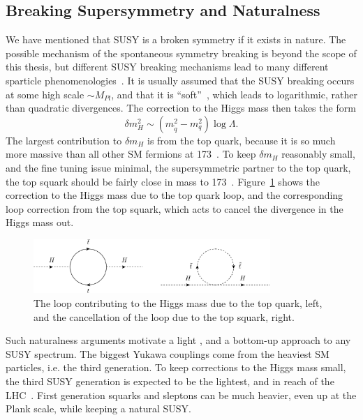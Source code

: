 \subsection{Breaking Supersymmetry and Naturalness \label{th:susyBreaking}}

We have mentioned that \ac{SUSY} is a broken symmetry if it exists in nature.
The possible mechanism of the spontaneous symmetry breaking is beyond the scope of this thesis, 
but different \ac{SUSY} breaking mechanisms lead to many different sparticle phenomenologies~\cite{susyMot2}. 
It is usually assumed that the \ac{SUSY} breaking occurs at some high scale $\sim M_{Pl}$, and that it is ``soft''~\cite{softsusy}, which leads to logarithmic, rather than quadratic divergences.
The correction to the Higgs mass then takes the form
\begin{equation}
\delta m_{H}^{2} \sim \left( m_{\tilde{q}}^{2} - m_{q}^{2} \right) \log{\Lambda}.
\end{equation}
The largest contribution to $\delta m_{H}$ is from the top quark, 
because it is so much more massive than all other \ac{SM} fermions at 173~\GeV.
To keep $\delta m_{H}$ reasonably small, and the fine tuning issue minimal, the supersymmetric partner to the top quark, the top squark \sTop should be fairly close in mass to 173~\GeV.
Figure~\ref{fig:SUSYmot} shows the correction to the Higgs mass due to the top quark loop, and the corresponding loop correction from the top squark, which acts to cancel the divergence in the Higgs mass out.

\begin{figure}[htbp]
  \begin{center}
  \includegraphics[width=0.8\textwidth]{Figures/theory/SUSYmot}
  \caption{The loop contributing to the Higgs mass due to the top quark, left, and the cancellation of the loop due to the top squark, right.}
  \label{fig:SUSYmot}
  \end{center}
\end{figure}

Such naturalness arguments motivate a light \sTop, and a bottom-up approach to any \ac{SUSY} spectrum.
The biggest Yukawa couplings come from the heaviest \ac{SM} particles, i.e. the third generation.  
To keep corrections to the Higgs mass small, the third \ac{SUSY} generation is expected to be the lightest, 
and in reach of the \ac{LHC}~\cite{natSUSY3,natSUSY4}.
First generation squarks and sleptons can be much heavier, even up at the Plank scale, 
while keeping a natural \ac{SUSY}.

